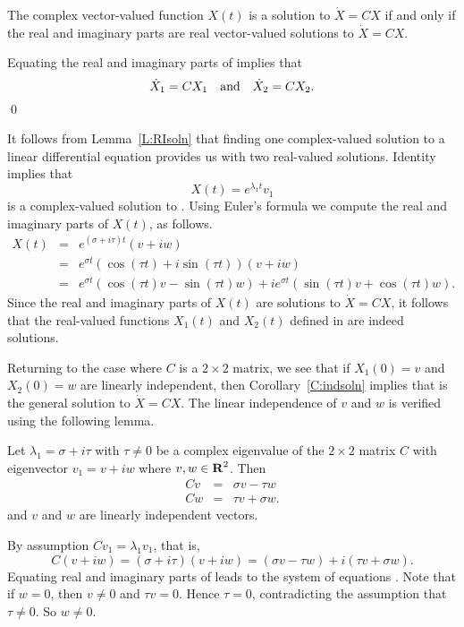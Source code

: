 \begin{lemma}  \label{L:RIsoln}
The complex vector-valued function $X(t)$ is a solution to $\dot{X}=CX$ if
and only if the real and imaginary parts are real vector-valued solutions
to $\dot{X}=CX$.
\end{lemma}

\proof Equating the real and imaginary parts of  implies that
\[
\dot{X}_1 = CX_1 \quad\mbox{and}\quad \dot{X}_2 = CX_2.
\]
\qed

It follows from Lemma~\ref{L:RIsoln} that finding one complex-valued solution
to a linear differential equation provides us with two real-valued solutions.
Identity  implies that
\[
X(t) = e^{\lambda_1 t}v_1
\]
is a complex-valued solution to .  Using Euler's formula we
compute the real and imaginary parts of $X(t)$, as follows.
\begin{eqnarray*}
X(t) & = & e^{(\sigma+i\tau)t}(v+iw) \\
& = & e^{\sigma t} (\cos(\tau t)+i\sin(\tau t))(v+iw)\\
& = & e^{\sigma t}(\cos(\tau t)v-\sin(\tau t)w)+
ie^{\sigma t}(\sin(\tau t)v+\cos(\tau t)w).
\end{eqnarray*}
Since the real and imaginary parts of $X(t)$ are solutions to $\dot{X}=CX$, it
follows that the real-valued functions $X_1(t)$ and $X_2(t)$ defined in
 are indeed solutions.

Returning to the case where $C$ is a $2\times 2$ matrix, we see that if
$X_1(0)=v$ and $X_2(0)=w$ are linearly independent, then
Corollary~\ref{C:indsoln} implies that  is the general solution to
$\dot{X}=CX$.  The linear independence of $v$ and $w$ is verified using the
following lemma.

\begin{lemma}  \label{L:rievind}
Let $\lambda_1=\sigma+i\tau$ with $\tau\neq 0$ be a
complex eigenvalue of the
$2\times 2$ matrix $C$ with eigenvector
$v_1=v+iw$ where $v,w\in\mbox{$\bf{R}$}^2$.  Then
\begin{equation}  \label{e:complexcoord}
\begin{array}{rcl}
Cv & = & \sigma v - \tau w \\
Cw & = & \tau v + \sigma w.
\end{array}
\end{equation}
and $v$ and $w$ are linearly independent vectors.
\end{lemma}

\proof   By assumption $Cv_1=\lambda_1v_1$, that is,
\begin{equation}  \label{E:viw}
C (v+iw) = (\sigma+i\tau)(v+iw) = (\sigma v - \tau w) + i(\tau v + \sigma w).
\end{equation}
Equating real and imaginary parts of  leads to the system of
equations .  Note that if $w=0$, then $v\neq 0$ and
$\tau v = 0$.  Hence $\tau=0$, contradicting the assumption that
$\tau\neq 0$.  So $w\neq 0$.

